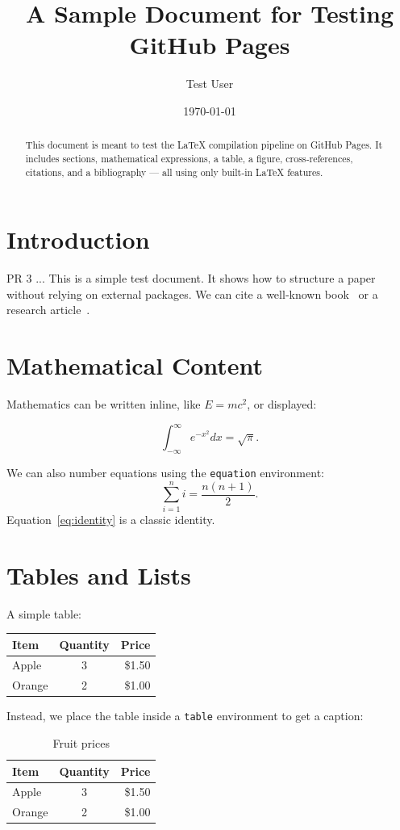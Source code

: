 \documentclass{article}
\title{A Sample Document for Testing GitHub Pages}
\author{Test User}
\date{\today}
\begin{document}
\maketitle

\begin{abstract}
This document is meant to test the LaTeX compilation pipeline on GitHub Pages.
It includes sections, mathematical expressions, a table, a figure, cross‑references,
citations, and a bibliography — all using only built‑in LaTeX features.
\end{abstract}

\section{Introduction}
PR 3 ... This is a simple test document. It shows how to structure a paper without relying on
external packages. We can cite a well‑known book~\cite{knuth:1984} or a research article~\cite{lamport:1994}.

\section{Mathematical Content}
Mathematics can be written inline, like $E = mc^2$, or displayed:

\[
\int_{-\infty}^{\infty} e^{-x^2} dx = \sqrt{\pi}.
\]

We can also number equations using the \texttt{equation} environment:
\begin{equation}
\label{eq:identity}
\sum_{i=1}^{n} i = \frac{n(n+1)}{2}.
\end{equation}
Equation~\eqref{eq:identity} is a classic identity.

\section{Tables and Lists}
A simple table:
\begin{center}
\begin{tabular}{|l|c|r|}
\hline
\textbf{Item} & \textbf{Quantity} & \textbf{Price} \\
\hline
Apple & 3 & \$1.50 \\
Orange & 2 & \$1.00 \\
\hline
\end{tabular}
\end{center}

Instead, we place the table inside a \texttt{table} environment to get a caption:
\begin{table}[h]
\centering
\begin{tabular}{|l|c|r|}
\hline
\textbf{Item} & \textbf{Quantity} & \textbf{Price} \\
\hline
Apple & 3 & \$1.50 \\
Orange & 2 & \$1.00 \\
\hline
\end{tabular}
\caption{Fruit prices}
\label{tab:prices}
\end{table}
\end{document}
